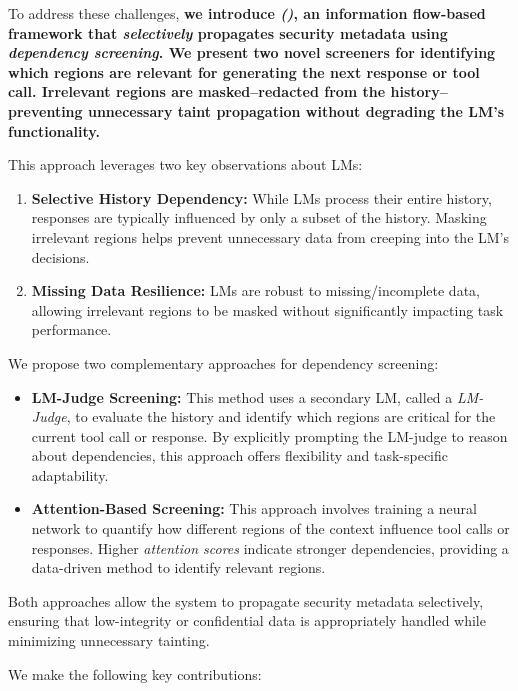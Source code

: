 To address these challenges, \textbf{we introduce \textit{\sysnamelong (\sysname)}, an information flow-based framework that \textit{selectively} propagates security metadata using \textit{dependency screening}. We present two novel screeners for identifying which regions are relevant for generating the next response or tool call. Irrelevant regions are masked--redacted from the history--preventing unnecessary taint propagation without degrading the LM's functionality.}

This approach leverages two key observations about LMs:

\begin{enumerate}
    \item \textbf{Selective History Dependency:} While LMs process their entire history, responses are typically influenced by only a subset of the history. Masking irrelevant regions helps prevent unnecessary data from creeping into the LM's decisions.
    \item \textbf{Missing Data Resilience:} LMs are robust to missing/in\-complete data, allowing irrelevant regions to be masked without significantly impacting task performance.
\end{enumerate}

We propose two complementary approaches for dependency screening:

\begin{itemize}
    \item \textbf{LM-Judge Screening:} This method uses a secondary LM, called a \textit{LM-Judge}, to evaluate the history and identify which regions are critical for the current tool call or response. By explicitly prompting the LM-judge to reason about dependencies, this approach offers flexibility and task-specific adaptability.
    \item \textbf{Attention-Based Screening:} This approach involves training a neural network to quantify how different regions of the context influence tool calls or responses. Higher \textit{attention scores} indicate stronger dependencies, providing a data-driven method to identify relevant regions. 
\end{itemize}

Both approaches allow the system to propagate security metadata selectively, ensuring that low-integrity or confidential data is appropriately handled while minimizing unnecessary tainting. 

We make the following key contributions:

